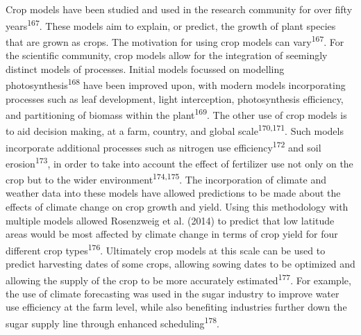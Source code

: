 \documentclass[12pt,]{book}
\begin{document}
Crop models have been studied and used in the research community for
over fifty years\textsuperscript{167}. These models aim to explain, or
predict, the growth of plant species that are grown as crops. The
motivation for using crop models can vary\textsuperscript{167}. For the
scientific community, crop models allow for the integration of seemingly
distinct models of processes. Initial models focussed on modelling
photosynthesis\textsuperscript{168} have been improved upon, with modern
models incorporating processes such as leaf development, light
interception, photosynthesis efficiency, and partitioning of biomass
within the plant\textsuperscript{169}. The other use of crop models is
to aid decision making, at a farm, country, and global
scale\textsuperscript{170,171}. Such models incorporate additional
processes such as nitrogen use efficiency\textsuperscript{172} and soil
erosion\textsuperscript{173}, in order to take into account the effect
of fertilizer use not only on the crop but to the wider
environment\textsuperscript{174,175}. The incorporation of climate and
weather data into these models have allowed predictions to be made about
the effects of climate change on crop growth and yield. Using this
methodology with multiple models allowed Rosenzweig et al. (2014) to
predict that low latitude areas would be most affected by climate change
in terms of crop yield for four different crop
types\textsuperscript{176}. Ultimately crop models at this scale can be
used to predict harvesting dates of some crops, allowing sowing dates to
be optimized and allowing the supply of the crop to be more accurately
estimated\textsuperscript{177}. For example, the use of climate
forecasting was used in the sugar industry to improve water use
efficiency at the farm level, while also benefiting industries further
down the sugar supply line through enhanced
scheduling\textsuperscript{178}.
\end{document}
